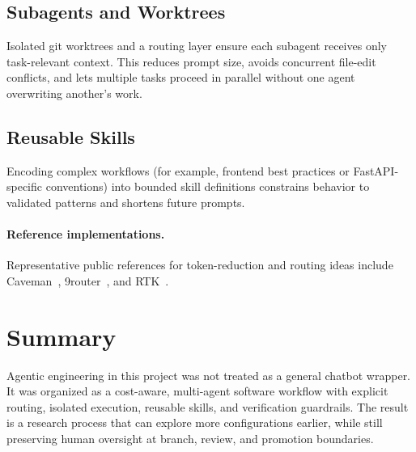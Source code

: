 \subsection{Subagents and Worktrees}\label{subagents-and-worktrees}

Isolated git worktrees and a routing layer ensure each subagent receives only task-relevant context. This reduces prompt size, avoids concurrent file-edit conflicts, and lets multiple tasks proceed in parallel without one agent overwriting another's work.

\subsection{Reusable Skills}\label{reusable-skills}

Encoding complex workflows (for example, frontend best practices or FastAPI-specific conventions) into bounded skill definitions constrains behavior to validated patterns and shortens future prompts.

\paragraph{Reference implementations.}
Representative public references for token-reduction and routing ideas include Caveman~\cite{caveman}, 9router~\cite{router9}, and RTK~\cite{rtk}.

\section{Summary}\label{agentic-summary}

Agentic engineering in this project was not treated as a general chatbot wrapper. It was organized as a cost-aware, multi-agent software workflow with explicit routing, isolated execution, reusable skills, and verification guardrails. The result is a research process that can explore more configurations earlier, while still preserving human oversight at branch, review, and promotion boundaries.
